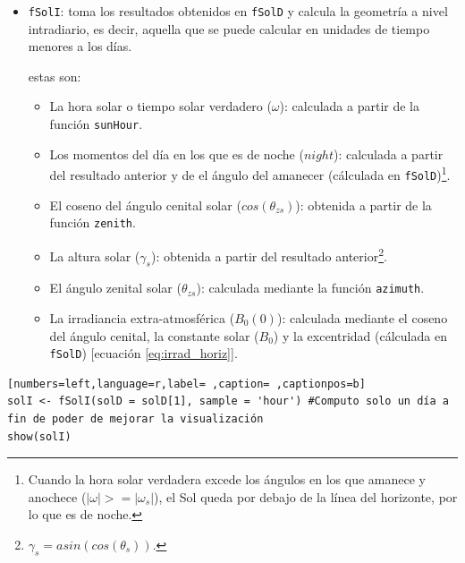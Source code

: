 \begin{itemize}
\item \texttt{fSolI}: toma los resultados obtenidos en \texttt{fSolD} y calcula la geometría a nivel intradiario, es decir, aquella que se puede calcular en unidades de tiempo menores a los días.

estas son:
\begin{itemize}
\item La hora solar o tiempo solar verdadero (\(\omega\)): calculada a partir de la función \texttt{sunHour}.
\item Los momentos del día en los que es de noche (\(night\)): calculada a partir del resultado anterior y de el ángulo del amanecer (cálculada en \texttt{fSolD})\footnote{Cuando la hora solar verdadera excede los ángulos en los que amanece y anochece (\(|\omega|>=|\omega_s|\)), el Sol queda por debajo de la línea del horizonte, por lo que es de noche.}.
\item El coseno del ángulo cenital solar (\(cos(\theta_{zs})\)): obtenida a partir de la función \texttt{zenith}.
\item La altura solar (\(\gamma_s\)): obtenida a partir del resultado anterior\footnote{\(\gamma_s=asin(cos(\theta_s))\).}.
\item El ángulo zenital solar (\(\theta_{zs}\)): calculada mediante la función \texttt{azimuth}.
\item La irradiancia extra-atmosférica (\(B_0(0)\)): calculada mediante el coseno del ángulo cenital, la constante solar (\(B_0\)) y la excentridad (cálculada en \texttt{fSolD}) [ecuación \ref{eq:irrad_horiz}].
\end{itemize}
\end{itemize}
\begin{lstlisting}[numbers=left,language=r,label= ,caption= ,captionpos=b]
solI <- fSolI(solD = solD[1], sample = 'hour') #Computo solo un día a fin de poder de mejorar la visualización
show(solI)
\end{lstlisting}

